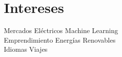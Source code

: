 \section{Intereses \faBook}
Mercados Eléctricos \textbullet{} Machine Learning\\ 
Emprendimiento \textbullet{} Energías Renovables\\
Idiomas \textbullet{} Viajes
\sectionsep